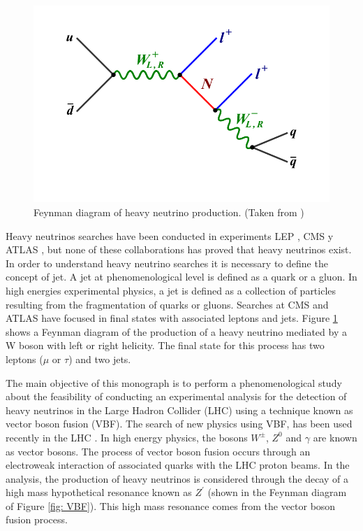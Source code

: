 \begin{figure}[H]
\centering
\includegraphics[width=\linewidth]{Figures/Feynman_W.png}
\caption{Feynman diagram of heavy neutrino production. (Taken from \cite{CMS ATLAS})}
\label{fig: W}
\end{figure}

Heavy neutrinos searches have been conducted in experiments LEP \cite{LEP}, CMS y ATLAS \cite{CMS ATLAS}, but none of these collaborations has proved that heavy neutrinos exist. In order to understand heavy neutrino searches it is necessary to define the concept of jet. A jet at phenomenological level is defined as a quark or a gluon. In high energies experimental physics, a jet is defined as a collection of particles resulting from the fragmentation of quarks or gluons. Searches at CMS and ATLAS have focused in final states with associated leptons and jets. Figure \ref{fig: W} shows a Feynman diagram of the production of a heavy neutrino mediated by a W boson with left or right helicity. The final state for this process has two leptons ($\mu$ or $\tau$) and two jets.

The main objective of this monograph is to perform a phenomenological study about the feasibility of conducting an experimental analysis for the detection of heavy neutrinos in the Large Hadron Collider (LHC) using a technique known as vector boson fusion (VBF). The search of new physics using VBF, has been used recently in the LHC \cite{VBF Search}. In high energy physics, the bosons $W^{\pm}$, $Z^{0}$ and $\gamma$ are known as vector bosons. The process of vector boson fusion occurs through an electroweak interaction of associated quarks with the LHC proton beams. In the analysis, the production of heavy neutrinos is considered through the decay of a high mass hypothetical resonance known as $Z^{'}$ (shown in the Feynman diagram of Figure \ref{fig: VBF}). This high mass resonance comes from the vector boson fusion process.

